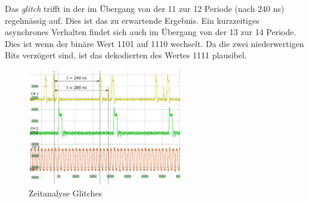  Das \textit{glitch} trifft in der im Übergang von der 11 zur 12 Periode (nach 240 ns) regelmässig auf. Dies ist das zu erwartende Ergebnis. Ein kurzzeitiges asynchrones Verhalten findet sich auch im Übergang von der 13 zur 14 Periode. Dies ist wenn der binäre Wert 1101 auf 1110 wechselt. Da die zwei niederwertigen Bits verzögert sind, ist das dekodierten des Wertes 1111 plausibel.\\
\begin{figure}[H]
	\includegraphics[width=0.6\textwidth]{images/glitch/Glitch_2_timing.png}
	\caption{Zeitanalyse Glitches}
	\label{fig.glitch.result_2}
\end{figure}



